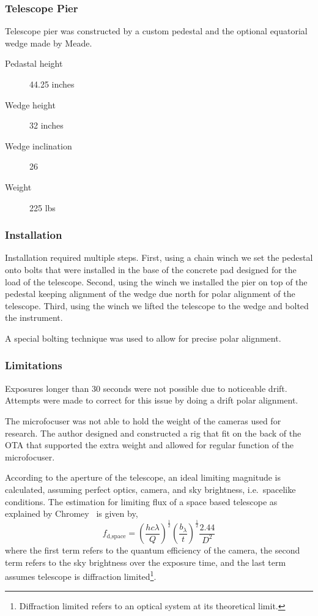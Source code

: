 \subsubsection{Telescope Pier}
Telescope pier was constructed by a custom pedestal and the optional equatorial wedge made by Meade.
\begin{description}
    \item[Pedastal height] 44.25 inches
    \item[Wedge height] 32 inches
    \item[Wedge inclination] \SI{26}{\deg}
    \item[Weight] 225 lbs
\end{description}

\subsubsection{Installation}
Installation required multiple steps.
First, using a chain winch we set the pedestal onto bolts that were installed in the base of the concrete pad designed for the load of the telescope. 
Second, using the winch we installed the pier on top of the pedestal keeping alignment of the wedge due north for polar alignment of the telescope.
Third, using the winch we lifted the telescope to the wedge and bolted the instrument.

A special bolting technique was used to allow for precise polar alignment.

\subsubsection{Limitations}
Exposures longer than 30 seconds were not possible due to noticeable drift.
Attempts were made to correct for this issue by doing a drift polar alignment.

The microfocuser was not able to hold the weight of the cameras used for research.
The author designed and constructed a rig that fit on the back of the OTA that supported the extra weight and allowed
for regular function of the microfocuser.

According to the aperture of the telescope, an ideal limiting magnitude is calculated, assuming perfect optics, camera, and sky brightness,
i.e.\  spacelike conditions.
The estimation for limiting flux of a space based telescope as explained by Chromey~\cite{chromey_2010} is given by,
\begin{equation}
    f_{\text{d,space}} = {\left(\frac{h c\lambda}{Q}\right)}^\frac{1}{2} {\left( \frac{b_{\lambda}}{t}\right)}^\frac{1}{2}\frac{2.44}{D^2}
    \label{eq:limflux}
\end{equation}
where the first term refers to the quantum efficiency of the camera, the second term refers to
the sky brightness over the exposure time, and the last term assumes telescope is
diffraction limited\footnote{Diffraction limited refers to an optical system at its theoretical limit.}.

